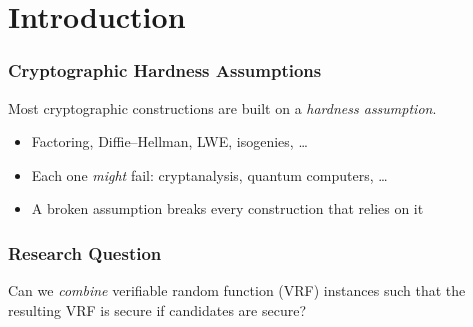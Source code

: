 \section{Introduction}
\label{sec:intro}

\begin{frame}[c]
    \frametitle{Cryptographic Hardness Assumptions}

    {\large
        Most cryptographic constructions are built on a \emph{hardness assumption}.
        \par
    }

    \vspace{1.2em}

    \begin{itemize}\setlength{\itemsep}{0.6em}
        \item<2-> Factoring, Diffie--Hellman, LWE, isogenies, \ldots
        \item<3-> Each one \emph{might} fail: cryptanalysis, quantum computers, \ldots
        \item<4-> A broken assumption breaks every construction that relies on it
    \end{itemize}

    \vspace{2em}

\end{frame}

\begin{frame}[c]
    \frametitle{Research Question}

    \begin{center}
        \begin{minipage}{0.9\textwidth}
            \Large
            \raggedright
            Can we \emph{combine} verifiable random function (VRF) instances such that the resulting VRF is secure if  candidates are secure?
        \end{minipage}
    \end{center}
\end{frame}
